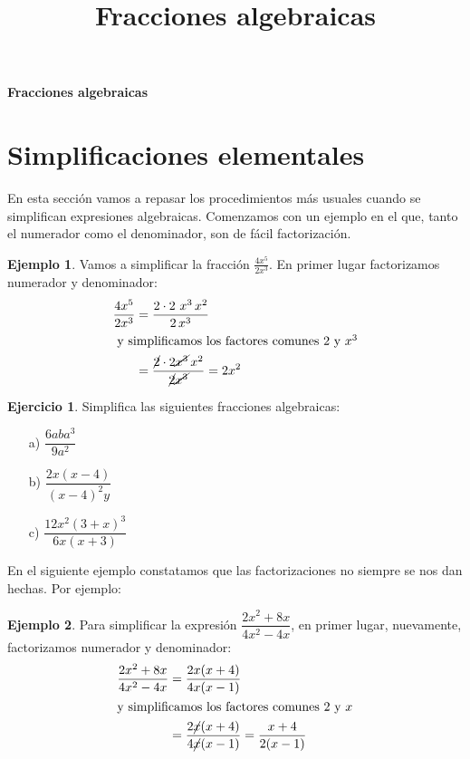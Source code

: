 \documentclass[13pt]{scrartcl}
\theoremstyle{definition}
\newtheorem{ejemplo}{Ejemplo}
\newtheorem{ejercicio}{Ejercicio}
\begin{document}
\title{Fracciones algebraicas}

{\huge \textsf{\textbf{\color{Peach} Fracciones algebraicas}}}

\vspace{1em}


\section{Simplificaciones elementales}

En esta sección vamos a repasar los procedimientos más usuales cuando se simplifican expresiones algebraicas. Comenzamos con un ejemplo en el que, tanto el numerador como el denominador, son de fácil factorización.
\begin{ejemplo} Vamos a simplificar la fracción $\frac{4x^5}{2x^3}$. En primer lugar factorizamos numerador y denominador:
\begin{align*}
\frac{4x^5}{2x^3} &= \frac{2 \cdot 2 \ x^3 \, x^2}{2 \, x^3} \\
\intertext{ y simplificamos los factores comunes $2$ y $x^3$}
& =\frac{\cancel{2} \cdot 2 \cancel{x^3} \, x^2}{\cancel{2} \cancel{x^3}}=2x^2
\end{align*}
\end{ejemplo}

\begin{ejercicio} Simplifica las siguientes fracciones algebraicas:
\begin{multicols}{3}
\begin{enumerate}
\item[a)] $\dfrac{6aba^3}{9a^2}$
\item[b)] $\dfrac{2x(x-4)}{(x-4)^2y}$
\item[c)] $\dfrac{12x^2(3+x)^3}{6x(x+3)}$
\end{enumerate}
\end{multicols}
\end{ejercicio}

\bigskip

En el siguiente ejemplo constatamos que las factorizaciones no siempre se nos dan hechas. Por ejemplo:

\begin{ejemplo} 
Para simplificar la expresión $\dfrac{ 2x^2+8x}{4x^2-4x}$, en primer lugar, nuevamente, factorizamos numerador y denominador:
\begin{align*}
\frac{ 2x^2+8x}{4x^2-4x} & =\frac{2x(x+4)}{4x(x-1)}  \\
\intertext{y simplificamos los  factores comunes $2$ y $x$}
& = \frac{2\cancel{x}(x+4)}{4\cancel{x}(x-1)} =\frac{x+4}{2(x-1)} 
\end{align*}
\end{ejemplo}
\end{document}
